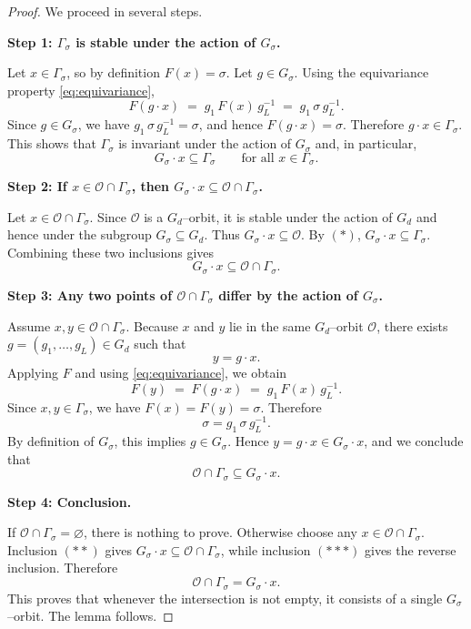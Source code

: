 \documentclass{article}
\theoremstyle{definition}
\begin{document}
\begin{proof}
We proceed in several steps.

\medskip\noindent
\textbf{Step 1: $\Gamma_\sigma$ is stable under the action of $G_\sigma$.}

Let $x\in\Gamma_\sigma$, so by definition $F(x)=\sigma$.  
Let $g\in G_\sigma$. Using the equivariance property \eqref{eq:equivariance},
\[
F(g\cdot x)
\;=\;
g_1\,F(x)\,g_L^{-1}
\;=\;
g_1\,\sigma\,g_L^{-1}.
\]
Since $g\in G_\sigma$, we have $g_1\,\sigma\,g_L^{-1}=\sigma$, and hence
$F(g\cdot x)=\sigma$. Therefore $g\cdot x\in\Gamma_\sigma$.  
This shows that $\Gamma_\sigma$ is invariant under the action of $G_\sigma$ and,
in particular,
\[
G_\sigma\cdot x \subseteq \Gamma_\sigma
\qquad
\text{for all } x\in\Gamma_\sigma .
\tag{$\ast$}
\]

\medskip\noindent
\textbf{Step 2: If $x\in\mathcal O\cap\Gamma_\sigma$, then
$G_\sigma\cdot x\subseteq \mathcal O\cap\Gamma_\sigma$.}

Let $x\in\mathcal O\cap\Gamma_\sigma$.  
Since $\mathcal O$ is a $G_d$--orbit, it is stable under the action of $G_d$ and
hence under the subgroup $G_\sigma\subseteq G_d$. Thus $G_\sigma\cdot x\subseteq
\mathcal O$.  
By $(\ast)$, $G_\sigma\cdot x\subseteq \Gamma_\sigma$.  
Combining these two inclusions gives
\[
G_\sigma\cdot x \subseteq \mathcal O\cap\Gamma_\sigma .
\tag{$\ast\ast$}
\]

\medskip\noindent
\textbf{Step 3: Any two points of $\mathcal O\cap\Gamma_\sigma$ differ by the
action of $G_\sigma$.}

Assume $x,y\in\mathcal O\cap\Gamma_\sigma$.  
Because $x$ and $y$ lie in the same $G_d$--orbit $\mathcal O$, there exists
$g=(g_1,\dots,g_L)\in G_d$ such that
\[
y = g\cdot x .
\]
Applying $F$ and using \eqref{eq:equivariance}, we obtain
\[
F(y)
\;=\;
F(g\cdot x)
\;=\;
g_1\,F(x)\,g_L^{-1}.
\]
Since $x,y\in\Gamma_\sigma$, we have $F(x)=F(y)=\sigma$. Therefore
\[
\sigma = g_1\,\sigma\,g_L^{-1}.
\]
By definition of $G_\sigma$, this implies $g\in G_\sigma$. Hence
$y=g\cdot x\in G_\sigma\cdot x$, and we conclude that
\[
\mathcal O\cap\Gamma_\sigma \subseteq G_\sigma\cdot x .
\tag{$\ast\ast\ast$}
\]

\medskip\noindent
\textbf{Step 4: Conclusion.}

If $\mathcal O\cap\Gamma_\sigma=\varnothing$, there is nothing to prove.
Otherwise choose any $x\in\mathcal O\cap\Gamma_\sigma$.  
Inclusion $(\ast\ast)$ gives $G_\sigma\cdot x\subseteq \mathcal O\cap\Gamma_\sigma$,
while inclusion $(\ast\ast\ast)$ gives the reverse inclusion. Therefore
\[
\mathcal O\cap\Gamma_\sigma = G_\sigma\cdot x .
\]
This proves that whenever the intersection is not empty, it consists of a single
$G_\sigma$--orbit. The lemma follows.
\end{proof}
\end{document}
